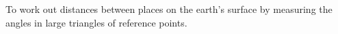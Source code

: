 To work out distances between places on the earth's surface
by measuring the angles in large triangles of reference
points.